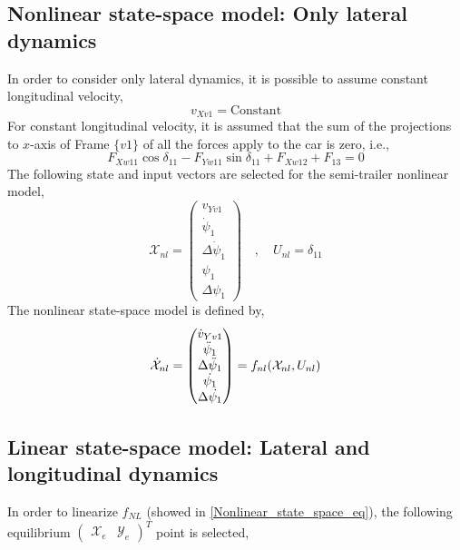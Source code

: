 \documentclass[12pt]{article}
\begin{document}
\subsection{Nonlinear state-space model: Only lateral dynamics}
In order to consider only lateral dynamics, it is possible to assume constant longitudinal velocity,
\begin{equation}
    v_{Xv1} = \mathrm{Constant}
\end{equation}
For constant longitudinal velocity, it is assumed that the sum of the projections to $x$-axis of Frame $\{ v1 \}$ of all the forces apply to the car is zero, i.e.,
\begin{equation}
    F_{Xw11} \cos{\delta_{11}} - F_{Yw11} \sin{\delta_{11}} + F_{Xw12} + F_{13} = 0
\end{equation}
The following state and input vectors are selected for the semi-trailer nonlinear model,
\begin{equation}\label{NL_states_input_vx}
    \mathcal{X}_{nl} = \begin{pmatrix} v_{Yv1} \\ \Dot{\psi}_1 \\ \Delta \Dot{\psi}_1 \\ \psi_1 \\ \Delta \psi_1 \end{pmatrix} \quad , \quad U_{nl} = \delta_{11}
\end{equation}
The nonlinear state-space model is defined by,
\begin{equation} \label{Nonlinear_state_space_vx_eq}
    \Dot{\mathcal{X}}_{nl} = \begin{pmatrix} \Dot{v}_{Yv1} \\ \Ddot{\psi}_1 \\ \Delta \Ddot{\psi}_1 \\ \Dot{\psi_1} \\ \Delta \Dot{\psi_1} \end{pmatrix} = f_{nl}(\mathcal{X}_{nl},U_{nl})
\end{equation}

\subsection{Linear state-space model: Lateral and longitudinal dynamics}
In order to linearize $f_{NL}$ (showed in \eqref{Nonlinear_state_space_eq}), the following equilibrium $ \begin{pmatrix} \mathcal{X}_e & \mathcal{Y}_e\end{pmatrix}^T$ point is selected,
\end{document}
